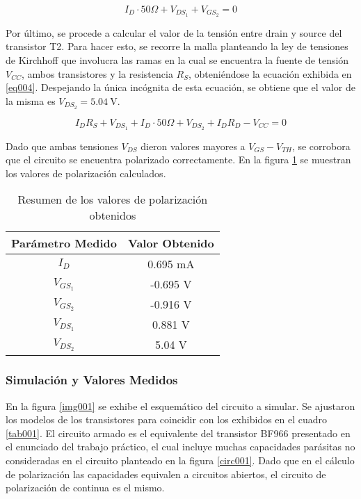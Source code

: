 \documentclass[a4paper,10pt]{article}
\begin{document}
				\begin{equation}
					I_D \cdot 50 \Omega  + V_{DS_1} + V_{GS_2} = 0 \label{eq003}
				\end{equation}

				Por último, se procede a calcular el valor de la tensión entre drain y source del transistor T2. Para hacer esto, se recorre la malla planteando la
				ley de tensiones de Kirchhoff que involucra las ramas en la cual se encuentra la fuente de tensión $V_{CC}$, ambos transistores y la resistencia $R_S$,
				obteniéndose la ecuación exhibida en \ref{eq004}. Despejando la única incógnita de esta ecuación, se obtiene que el valor de la misma es
				$V_{DS_2} = 5.04~\text{V}$. 
				
				\begin{equation}
					I_{D} R_{S} + V_{DS_1} + I_D \cdot 50 \Omega + V_{DS_2} + I_D R_D - V_{CC} = 0 \label{eq004}
				\end{equation}

				Dado que ambas tensiones $V_{DS}$ dieron valores mayores a $V_{GS} - V_{TH}$, se corrobora que el circuito se encuentra polarizado correctamente. 
				En la figura \ref{tab002} se muestran los valores de polarización calculados. 

				\begin{table}[!htb]
					\centering
					\begin{tabular}{|c|c|}
						\hline
						Parámetro Medido & Valor Obtenido  \\
						\hline
						$I_{D}$ & 0.695 mA \\
						\hline
						$V_{GS_1}$ & -0.695 V \\
						\hline
						$V_{GS_2}$ & -0.916 V \\
						\hline
						$V_{DS_1}$ & 0.881 V \\
						\hline
						$V_{DS_2}$ & 5.04 V \\
						\hline
					\end{tabular}
					\caption{Resumen de los valores de polarización obtenidos} \label{tab002}
				\end{table}

			\subsubsection{Simulación y Valores Medidos}
				En la figura \ref{img001} se exhibe el esquemático del circuito a simular. Se ajustaron los modelos de los transistores para coincidir con los
				exhibidos en el cuadro \ref{tab001}. El circuito armado es el equivalente del transistor BF966 presentado en el enunciado del trabajo práctico,
				el cual incluye muchas capacidades parásitas no consideradas en el circuito planteado en la figura \ref{circ001}. Dado que en el cálculo de 
				polarización las capacidades equivalen a circuitos abiertos, el circuito de polarización de continua es el mismo. \\
\end{document}
